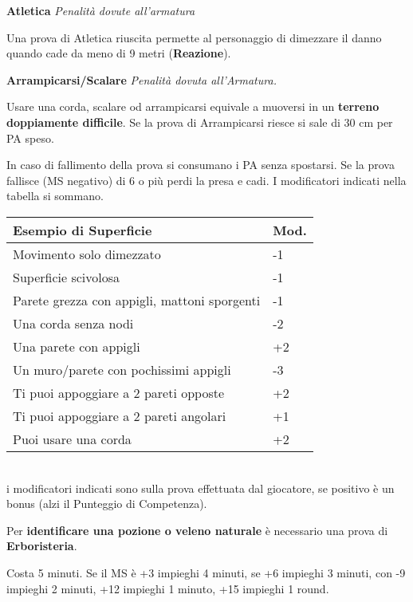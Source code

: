 \documentclass[12pt,a4paper,twoside,openany]{book}
\begin{document}
\begin{multicols}{2}
\medskip

\textbf{Atletica} \textit{Penalità dovute all'armatura}

Una prova di Atletica riuscita permette al personaggio di dimezzare il danno quando cade da meno di 9 metri (\textbf{Reazione}).

\medskip

\textbf{Arrampicarsi/Scalare}  \textit{Penalità dovuta all'Armatura.}

\medskip

Usare una corda, scalare od arrampicarsi equivale a muoversi in un \textbf{terreno doppiamente difficile}. Se la prova di Arrampicarsi riesce si sale di 30 cm per PA speso.

In caso di fallimento della prova si consumano i PA senza spostarsi. Se la prova fallisce (MS negativo) di 6 o più perdi la presa e cadi. I modificatori indicati nella tabella si sommano.\\

\begin{tabularx}{0.45\textwidth}{Xl}
	\textbf{Esempio di Superficie} & Mod.\\
	\toprule
	Movimento solo dimezzato & -1\\
	Superficie scivolosa&-1\\
	Parete grezza con appigli, mattoni sporgenti&-1\\
	Una corda senza nodi&-2\\
	Una parete con appigli &+2\\
	Un muro/parete con pochissimi appigli&-3\\
	Ti puoi appoggiare a 2 pareti opposte&+2\\
	Ti puoi appoggiare a 2 pareti angolari&+1\\
	Puoi usare una corda&+2\\
\end{tabularx}\\

i modificatori indicati sono sulla prova effettuata dal giocatore, se positivo è un bonus (alzi il Punteggio di Competenza).

\medskip

Per \textbf{identificare una pozione o veleno naturale} è necessario una prova di \textbf{Erboristeria}.

Costa 5 minuti. Se il MS è +3 impieghi 4 minuti, se +6 impieghi 3 minuti, con -9 impieghi 2 minuti, +12 impieghi 1 minuto, +15 impieghi 1 round.


\end{multicols}
\end{document}
